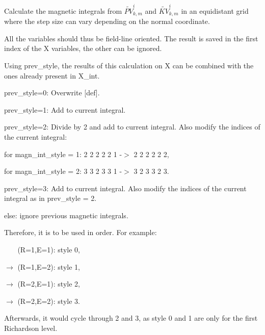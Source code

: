 Calculate the magnetic integrals from $\widetilde{PV}_{k,m}^i$ and $\widetilde{KV}_{k,m}^i$ in an equidistant grid where the step size can vary depending on the normal coordinate. 

All the variables should thus be field-\/line oriented. The result is saved in the first index of the X variables, the other can be ignored.

Using {\ttfamily prev\+\_\+style}, the results of this calculation on X can be combined with the ones already present in {\ttfamily X\+\_\+int}.
\begin{DoxyItemize}
\item {\ttfamily prev\+\_\+style=0}\+: Overwrite \mbox{[}def\mbox{]}.
\item {\ttfamily prev\+\_\+style=1}\+: Add to current integral.
\item {\ttfamily prev\+\_\+style=2}\+: Divide by 2 and add to current integral. Also modify the indices of the current integral\+:
\begin{DoxyItemize}
\item for {\ttfamily magn\+\_\+int\+\_\+style} = 1\+: { 2 2 2 2 2 1 -\/$>$ 2 2 2 2 2 2},
\item for {\ttfamily magn\+\_\+int\+\_\+style} = 2\+: { 3 3 2 3 3 1 -\/$>$ 3 2 3 3 2 3}.
\end{DoxyItemize}
\item {\ttfamily prev\+\_\+style=3}\+: Add to current integral. Also modify the indices of the current integral as in {\ttfamily prev\+\_\+style} = 2.
\item else\+: ignore previous magnetic integrals.
\end{DoxyItemize}

Therefore, it is to be used in order. For example\+:
\begin{DoxyEnumerate}
\item $\phantom{\rightarrow}$ (R=1,E=1)\+: style 0,
\item $\rightarrow$ (R=1,E=2)\+: style 1,
\item $\rightarrow$ (R=2,E=1)\+: style 2,
\item $\rightarrow$ (R=2,E=2)\+: style 3.
\end{DoxyEnumerate}

Afterwards, it would cycle through 2 and 3, as style 0 and 1 are only for the first Richardson level.

